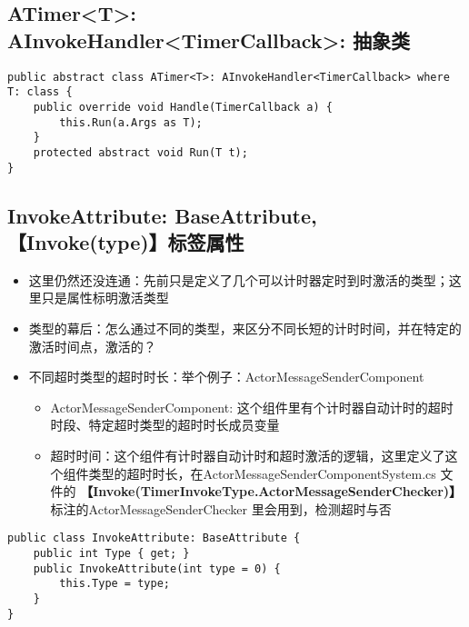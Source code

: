 \documentclass[9pt, b5paper]{article}
\begin{document}
\subsection{ATimer<T>: AInvokeHandler<TimerCallback>: 抽象类}
\label{sec-1-20}
\begin{verbatim}
public abstract class ATimer<T>: AInvokeHandler<TimerCallback> where T: class {
    public override void Handle(TimerCallback a) {
        this.Run(a.Args as T);
    }
    protected abstract void Run(T t);
}
\end{verbatim}
\subsection{InvokeAttribute: BaseAttribute, 【Invoke(type)】标签属性}
\label{sec-1-21}
\begin{itemize}
\item 这里仍然还没连通：先前只是定义了几个可以计时器定时到时激活的类型；这里只是属性标明激活类型
\item 类型的幕后：怎么通过不同的类型，来区分不同长短的计时时间，并在特定的激活时间点，激活的？
\item 不同超时类型的超时时长：举个例子：ActorMessageSenderComponent
\begin{itemize}
\item ActorMessageSenderComponent: 这个组件里有个计时器自动计时的超时时段、特定超时类型的超时时长成员变量
\item 超时时间：这个组件有计时器自动计时和超时激活的逻辑，这里定义了这个组件类型的超时时长，在ActorMessageSenderComponentSystem.cs 文件的 \textbf{【Invoke(TimerInvokeType.ActorMessageSenderChecker)】} 标注的ActorMessageSenderChecker 里会用到，检测超时与否
\end{itemize}
\end{itemize}
\begin{verbatim}
public class InvokeAttribute: BaseAttribute {
    public int Type { get; }
    public InvokeAttribute(int type = 0) {
        this.Type = type;
    }
}
\end{verbatim}
\end{document}
